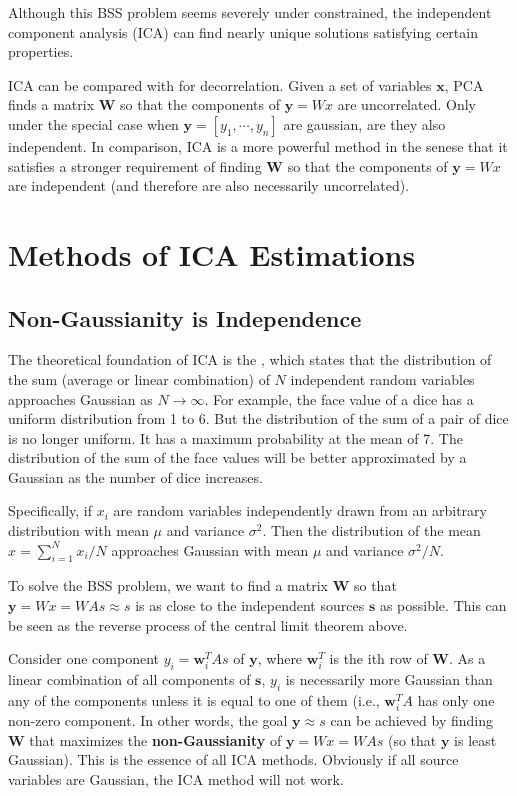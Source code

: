 Although this BSS problem seems severely under constrained, the independent
component analysis (ICA) can find nearly unique solutions satisfying
certain properties.

ICA can be compared with
for decorrelation.  Given a set of variables ${\mathbf x}$, PCA finds a
matrix ${\mathbf W}$ so that the components of ${\mathbf y=Wx}$ are
uncorrelated. Only under the special case when ${\mathbf y}=[y_1,\cdots,y_n]$
are gaussian, are they also independent. In comparison, ICA is a more powerful
method in the senese that it satisfies a stronger requirement of finding
${\mathbf W}$ so that the components of ${\mathbf y=Wx}$ are independent
(and therefore are also necessarily uncorrelated).

\section*{Methods of ICA Estimations}

\subsection*{Non-Gaussianity is Independence}

The theoretical foundation of ICA is the
,
which states that the distribution of the sum (average or linear
combination) of $N$ independent random variables approaches Gaussian
as $N\rightarrow \infty$. For example, the face value of a dice has a
uniform distribution from 1 to 6. But the distribution of the sum of a
pair of dice is no longer uniform. It has a maximum probability at the
mean of 7. The distribution of the sum of the face values will be better
approximated by a Gaussian as the number of dice increases.

Specifically, if $x_i$ are random variables independently drawn from an
arbitrary distribution with mean $\mu$ and variance $\sigma^2$. Then the
distribution of the mean $x=\sum_{i=1}^N x_i/N$ approaches Gaussian with
mean $\mu$ and variance $\sigma^2/N$.

To solve the BSS problem, we want to find a matrix ${\mathbf W}$ so that
${\mathbf y=Wx=WAs \approx s}$ is as close to the independent sources
${\mathbf s}$ as possible. This can be seen as the reverse process of the
central limit theorem above.

Consider one component $y_i={\mathbf w_i^TAs}$ of ${\mathbf y}$, where
${\mathbf w_i^T}$ is the ith row of ${\mathbf W}$. As a linear combination
of all components of ${\mathbf s}$, $y_i$ is necessarily more Gaussian
than any of the components unless it is equal to one of them (i.e.,
${\mathbf w_i^TA}$ has only one non-zero component.
In other words, the goal ${\mathbf y \approx s}$ can be achieved by finding
${\mathbf W}$ that maximizes the {\bf non-Gaussianity} of
${\mathbf y=Wx=WAs}$ (so that ${\mathbf y}$ is least Gaussian). This is
the essence of all ICA methods. Obviously if all source variables are
Gaussian, the ICA method will not work.

